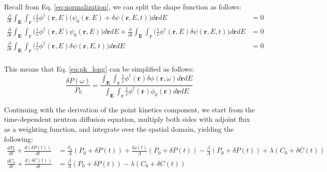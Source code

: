 Recall from Eq. \ref{eq:normalization}, we can split the shape function as follows:
\begin{equation}\label{eq:normalization_split}
\begin{aligned}
        \frac{\partial}{\partial t} \int_{\textbf{E}} \int_{\textbf{r}} \biggl( \frac{1}{v} \phi^{\dagger}(\textbf{r}, E) (\psi_0 (\textbf{r}, E) + \delta \psi (\textbf{r}, E, t) \biggr) d\textbf{r} dE &= 0 \\
        \frac{\partial}{\partial t} \int_{\textbf{E}} \int_{\textbf{r}} \biggl( \frac{1}{v} \phi^{\dagger}(\textbf{r}, E) \psi_0 (\textbf{r}, E) \biggr) d\textbf{r} dE + \frac{\partial}{\partial t} \int_{\textbf{E}} \int_{\textbf{r}} \biggl( \frac{1}{v} \phi^{\dagger}(\textbf{r}, E) \delta \psi (\textbf{r}, E, t) \biggr) d\textbf{r} dE &= 0 \\
        \frac{\partial}{\partial t} \int_{\textbf{E}} \int_{\textbf{r}} \biggl( \frac{1}{v} \phi^{\dagger}(\textbf{r}, E) \delta \psi (\textbf{r}, E, t) \biggr) d\textbf{r} dE &= 0 \\
\end{aligned}
\end{equation}

This means that Eq. \ref{eq:pk_long} can be simplified as follows:
\begin{equation}
        \frac{ \delta P(\omega)}{P_0} = \frac{\int_{\textbf{E}} \int_{\textbf{r}} \frac{1}{v} \phi^{\dagger}(\textbf{r}) \delta \phi(\textbf{r}, \omega) d\textbf{r} dE}{\int_{\textbf{E}} \int_{\textbf{r}} \frac{1}{v} \phi^{\dagger}(\textbf{r}) \phi_0(\textbf{r}) d\textbf{r} dE}
\end{equation}

Continuing with the derivation of the point kinetics component, we start from the time-dependent neutron diffusion equation, multiply both sides with adjoint flux as a weighting function, and integrate over the spatial domain, yielding the following:
\begin{equation}
    \begin{aligned}
        \frac{dP_0}{dt} + \frac{d(\delta P(t))}{dt} &= \frac{\rho_0}{\Lambda} (P_0 + \delta P(t)) + \frac{\delta \rho(t)}{\Lambda} (P_0 + \delta P(t)) - \frac{\beta}{\Lambda} (P_0 + \delta P(t)) + \lambda (C_0 + \delta C(t))\\
        \frac{dC_0}{dt} + \frac{d(\delta C(t))}{dt} &= \frac{\beta}{\Lambda} (P_0 + \delta P(t)) - \lambda (C_0 + \delta C(t))\\
    \end{aligned}
\end{equation}

